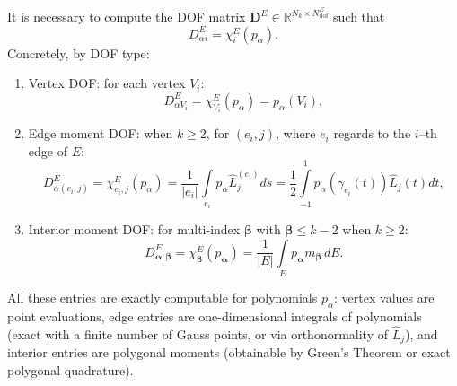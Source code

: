 \documentclass{article}
\newcommand{\numdofs}{N^E_{\text{dof}}}
\begin{document}
It is necessary to compute the DOF matrix $\mathbf{D}^E \in \mathbb{R}^{N_k \times \numdofs}$ such that
\begin{equation}
    \nonumber
    D^E_{\alpha i} = \chi^E_i(p_\alpha).
\end{equation}
Concretely, by DOF type:
\begin{enumerate}
    \item Vertex DOF: for each vertex $V_i$:
        \begin{equation}
    \nonumber
            D^E_{\alpha V_i} = \chi^E_{V_i}(p_\alpha) = p_\alpha (V_i), \nonumber    
        \end{equation}
    \item Edge moment DOF: when $k \geq 2$, for $(e_i, j)$, where $e_i$ regards to the $i$--th edge of $E$:
        \begin{equation}
    \nonumber
            D^E_{\alpha (e_i, j)} = \chi^E_{e_i, j}(p_\alpha) = \frac{1}{|e_i|} \int \limits_{e_i} p_\alpha \hat{L}_j^{(e_i)}ds = \frac{1}{2} \int \limits^{1}_{-1} p_\alpha (\gamma_{e_i}(t))\hat{L}_j(t)dt, \nonumber
        \end{equation}
    \item Interior moment DOF: for multi-index $\boldsymbol{\beta}$ with $\boldsymbol{\beta} \leq k - 2$ when $k \geq 2$:
        \begin{equation}
    \nonumber
            D^E_{\boldsymbol{\alpha}, \boldsymbol{\beta}} = \chi^E_{\boldsymbol{\beta}}(p_{\boldsymbol{\alpha}}) = \frac{1}{|E|} \int \limits_E p_{\boldsymbol{\alpha}} m_{\boldsymbol{\beta}} \, dE.
        \end{equation}
\end{enumerate}
All these entries are exactly computable for polynomials $p_\alpha$: vertex values are point evaluations, edge entries are one-dimensional integrals of polynomials (exact with a finite number of Gauss points, or via orthonormality of $\hat{L}_j$), and interior entries are polygonal moments (obtainable by Green's Theorem or exact polygonal quadrature). 
\end{document}
